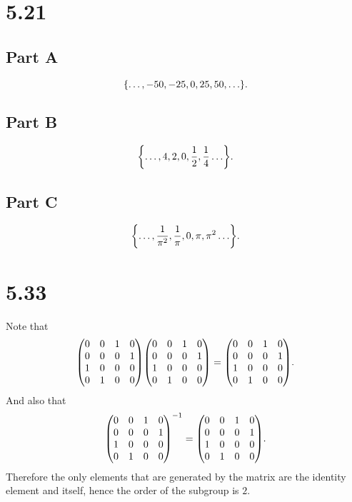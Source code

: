 \documentclass[12pt]{extarticle}
\begin{document}
\section*{5.21}
\subsection*{Part A}
\[
	\qty{\ldots, -50, -25, 0, 25, 50, \ldots}
.\]
\subsection*{Part B}
\[
	\qty{\ldots, 4, 2 , 0, \frac{1}{2}, \frac{1}{4} \ldots}
.\]
\subsection*{Part C}
\[
	\qty{\ldots, \frac{1}{\pi^2}, \frac{1}{\pi}, 0, \pi, \pi^2 \ldots}
.\]

\section*{5.33}
Note that
\[
	\mqty(
		0 & 0 & 1 & 0 \\
 		0 & 0 & 0 & 1 \\
 		1 & 0 & 0 & 0 \\
 		0 & 1 & 0 & 0 \\
	)
	\mqty(
		0 & 0 & 1 & 0 \\
 		0 & 0 & 0 & 1 \\
 		1 & 0 & 0 & 0 \\
 		0 & 1 & 0 & 0 \\
	)
	=
	\mqty(
		0 & 0 & 1 & 0 \\
 		0 & 0 & 0 & 1 \\
 		1 & 0 & 0 & 0 \\
 		0 & 1 & 0 & 0 \\
	)
.\]
And also that
\[
	\mqty(
		0 & 0 & 1 & 0 \\
 		0 & 0 & 0 & 1 \\
 		1 & 0 & 0 & 0 \\
 		0 & 1 & 0 & 0 \\
	)^{-1} = 
	\mqty(
		0 & 0 & 1 & 0 \\
 		0 & 0 & 0 & 1 \\
 		1 & 0 & 0 & 0 \\
 		0 & 1 & 0 & 0 \\
	)
.\]
Therefore the only elements that are generated by the matrix are the identity element and itself, hence the order of the subgroup is $2$.
\end{document}
